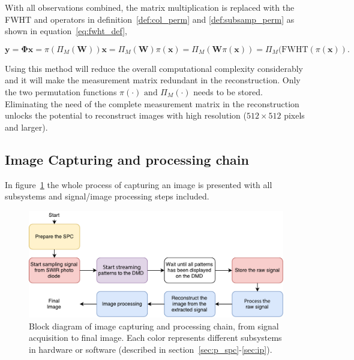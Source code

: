 With all observations combined, the matrix multiplication is replaced with the FWHT and operators in definition~\ref{def:col_perm} and \ref{def:subsamp_perm} as shown in equation~\ref{eq:fwht_def},

\begin{equation}
\mathbf{y} = \mathbf{\Phi}\mathbf{x} = \pi(\Pi_M(\mathbf{W}))\mathbf{x} = \Pi_M(\mathbf{W})\pi(\mathbf{x}) = \Pi_M(\mathbf{W}\pi(\mathbf{x})) = \Pi_M(\text{FWHT}(\pi(\mathbf{x}))\text{.}
\label{eq:fwht_def}
\end{equation}

Using this method will reduce the overall computational complexity considerably and it will make the measurement matrix redundant in the reconstruction. Only the two permutation functions $\pi(\cdot) \text{ and } \Pi_M(\cdot)$ needs to be stored. Eliminating the need of the complete measurement matrix in the reconstruction unlocks the potential to reconstruct images with high resolution ($512\times512$ pixels and larger). \cite{article:SRM_long, article:TVAL3}



\subsection{Image Capturing and processing chain}
\label{sec:image_capturing_and_process_chain}
In figure~\ref{fig:flow_chart} the whole process of capturing an image is presented with all subsystems and signal/image processing steps included.

\begin{figure}[H]
\includegraphics[width = 1\linewidth]{gfx/flowchart3.pdf}
\caption{Block diagram of image capturing and processing chain, from signal acquisition to final image. Each color represents different subsystems in hardware or software (described in section~\ref{sec:p_spc}-\ref{sec:ip}).}
	\label{fig:flow_chart}
\end{figure}

